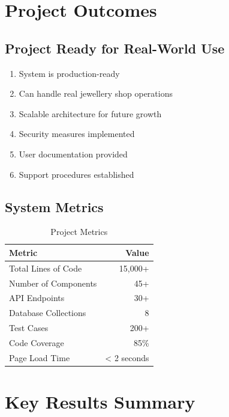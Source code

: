 \documentclass[12pt,a4paper]{report}
\begin{document}
\section{Project Outcomes}

\subsection{Project Ready for Real-World Use}

\begin{enumerate}[label=\roman*)]
    \item System is production-ready
    \item Can handle real jewellery shop operations
    \item Scalable architecture for future growth
    \item Security measures implemented
    \item User documentation provided
    \item Support procedures established
\end{enumerate}

\subsection{System Metrics}

\begin{table}[H]
    \centering
    \begin{tabular}{|l|r|}
        \hline
        \textbf{Metric} & \textbf{Value} \\
        \hline
        Total Lines of Code & 15,000+ \\
        \hline
        Number of Components & 45+ \\
        \hline
        API Endpoints & 30+ \\
        \hline
        Database Collections & 8 \\
        \hline
        Test Cases & 200+ \\
        \hline
        Code Coverage & 85\% \\
        \hline
        Page Load Time & < 2 seconds \\
        \hline
    \end{tabular}
    \caption{Project Metrics}
\end{table}
\pagebreak
\section{Key Results Summary}
\end{document}
